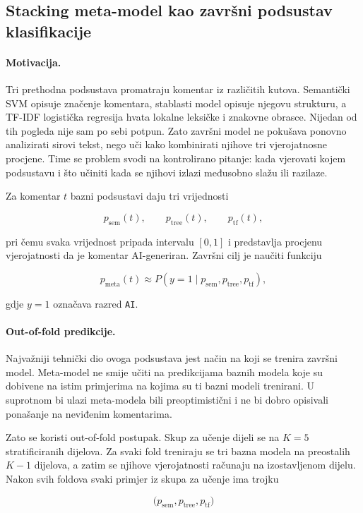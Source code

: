 \subsection{Stacking meta-model kao završni podsustav klasifikacije}

\paragraph{Motivacija.}
Tri prethodna podsustava promatraju komentar iz različitih kutova. Semantički SVM opisuje značenje komentara, stablasti model opisuje njegovu strukturu, a TF-IDF logistička regresija hvata lokalne leksičke i znakovne obrasce. Nijedan od tih pogleda nije sam po sebi potpun. Zato završni model ne pokušava ponovno analizirati sirovi tekst, nego uči kako kombinirati njihove tri vjerojatnosne procjene. Time se problem svodi na kontrolirano pitanje: kada vjerovati kojem podsustavu i što učiniti kada se njihovi izlazi međusobno slažu ili razilaze.

Za komentar $t$ bazni podsustavi daju tri vrijednosti

\[
p_{\mathrm{sem}}(t),
\qquad
p_{\mathrm{tree}}(t),
\qquad
p_{\mathrm{tf}}(t),
\]

pri čemu svaka vrijednost pripada intervalu $[0,1]$ i predstavlja procjenu vjerojatnosti da je komentar AI-generiran. Završni cilj je naučiti funkciju

\[
p_{\mathrm{meta}}(t) \approx P(y=1\mid p_{\mathrm{sem}},p_{\mathrm{tree}},p_{\mathrm{tf}}),
\]

gdje $y=1$ označava razred \texttt{AI}.

\paragraph{Out-of-fold predikcije.}
Najvažniji tehnički dio ovoga podsustava jest način na koji se trenira završni model. Meta-model ne smije učiti na predikcijama baznih modela koje su dobivene na istim primjerima na kojima su ti bazni modeli trenirani. U suprotnom bi ulazi meta-modela bili preoptimistični i ne bi dobro opisivali ponašanje na neviđenim komentarima.

Zato se koristi out-of-fold postupak. Skup za učenje dijeli se na $K=5$ stratificiranih dijelova. Za svaki fold treniraju se tri bazna modela na preostalih $K-1$ dijelova, a zatim se njihove vjerojatnosti računaju na izostavljenom dijelu. Nakon svih foldova svaki primjer iz skupa za učenje ima trojku

\[
\bigl(p_{\mathrm{sem}},p_{\mathrm{tree}},p_{\mathrm{tf}}\bigr)
\]

